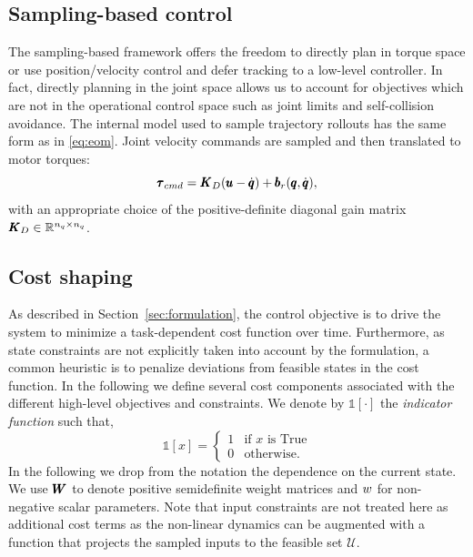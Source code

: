 \subsection{Sampling-based control}
The sampling-based framework offers the freedom to directly plan in torque space or use position/velocity control and defer tracking to a low-level controller. In fact, directly planning in the joint space allows us to account for objectives which are not in the operational control space such as joint limits and self-collision avoidance. The internal model used to sample trajectory rollouts has the same form as in \eqref{eq:eom}. Joint velocity commands are sampled and then translated to motor torques:
\begin{equation}
    \pmb{\tau}_{cmd} = \pmb{K}_{D} (\pmb{u} - \dot{\pmb{q}}) + \pmb{b}_{r}(\pmb{q}, \dot{\pmb{q}}),
\end{equation}
with an appropriate choice of the positive-definite diagonal gain matrix $\pmb{K}_{D} \in \mathbb{R}^{n_q\times n_q}$. 

\subsection{Cost shaping}
As described in Section~\ref{sec:formulation}, the control objective is to drive the system to minimize a task-dependent cost function over time. Furthermore, as state constraints are not explicitly taken into account by the formulation, a common heuristic is to penalize deviations from feasible states in the cost function. In the following we define several cost components associated with the different high-level objectives and constraints.
We denote by $\mathds{1}[\cdot]$ the \textit{indicator function} such that,
\begin{equation}
    \mathds{1}[x] = 
    \begin{cases}
    1 & \text{if } x \text{ is True} \\
    0 & \text{otherwise}.
    \end{cases}
\end{equation}
In the following we drop from the notation the dependence on the current state. We use $\pmb{W}_{}$ to denote positive semidefinite weight matrices and $w_{}$ for non-negative scalar parameters. Note that input constraints are not treated here as additional cost terms as the non-linear dynamics can be augmented with a function that projects the sampled inputs to the feasible set $\mathcal{U}$.


